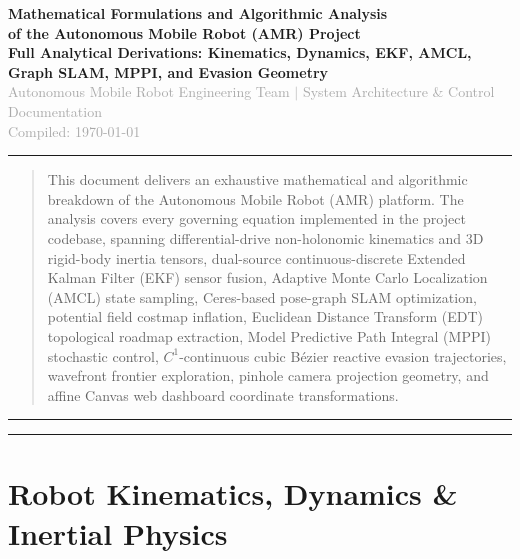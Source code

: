 \documentclass[10pt,a4paper]{article}
\begin{document}
\begin{center}
    {\Huge \textcolor{primary}{\textbf{Mathematical Formulations and Algorithmic Analysis}}}\\[0.25cm]
    {\LARGE \textcolor{secondary}{\textbf{of the Autonomous Mobile Robot (AMR) Project}}}\\[0.35cm]
    {\large \textbf{Full Analytical Derivations: Kinematics, Dynamics, EKF, AMCL, Graph SLAM, MPPI, and Evasion Geometry}}\\[0.2cm]
    {\normalsize \textcolor{darkgray}{Autonomous Mobile Robot Engineering Team $|$ System Architecture \& Control Documentation}}\\[0.15cm]
    {\footnotesize \textcolor{darkgray}{Compiled: \today}}
\end{center}

\vspace{0.2cm}
\hrule height 1pt
\vspace{0.3cm}

\begin{abstract}
\noindent This document delivers an exhaustive mathematical and algorithmic breakdown of the Autonomous Mobile Robot (AMR) platform. The analysis covers every governing equation implemented in the project codebase, spanning differential-drive non-holonomic kinematics and 3D rigid-body inertia tensors, dual-source continuous-discrete Extended Kalman Filter (EKF) sensor fusion, Adaptive Monte Carlo Localization (AMCL) state sampling, Ceres-based pose-graph SLAM optimization, potential field costmap inflation, Euclidean Distance Transform (EDT) topological roadmap extraction, Model Predictive Path Integral (MPPI) stochastic control, $C^1$-continuous cubic B\'ezier reactive evasion trajectories, wavefront frontier exploration, pinhole camera projection geometry, and affine Canvas web dashboard coordinate transformations.
\end{abstract}

\vspace{0.2cm}
\hrule
\vspace{0.3cm}

\tableofcontents
\vspace{0.4cm}
\hrule height 1pt
\vspace{0.5cm}

\section{Robot Kinematics, Dynamics \& Inertial Physics}
\end{document}

